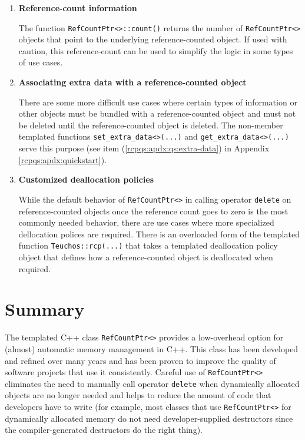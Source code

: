 \documentclass[pdf,ps2pdf,11pt]{SANDreport}
\begin{document}
\begin{enumerate}

\item \textbf{Reference-count information}

The function {}\texttt{Ref\-Count\-Ptr<>\-::count()} returns the
number of {}\texttt{Ref\-Count\-Ptr<>} objects that point to the
underlying reference-counted object.  If used with caution, this
reference-count can be used to simplify the logic in some types of use
cases.

\item \textbf{Associating extra data with a reference-counted object}

There are some more difficult use cases where certain types of
information or other objects must be bundled with a reference-counted
object and must not be deleted until the reference-counted object is
deleted.  The non-member templated functions
{}\texttt{set\-\_extra\-\_data<>(...)} and
{}\texttt{get\-\_extra\-\_data<>(...)} serve this purpose (see item
({}\ref{rcpqs:apdx:qs:extra-data}) in Appendix
{}\ref{rcpqs:apdx:quickstart}).

\item \textbf{Customized deallocation policies}

While the default behavior of {}\texttt{Ref\-Count\-Ptr<>} in calling
operator {}\texttt{delete} on reference-counted objects once the
reference count goes to zero is the most commonly needed behavior,
there are use cases where more specialized dellocation polices are
required.  There is an overloaded form of the templated function
{}\texttt{Teuchos\-::rcp(...)} that takes a templated deallocation
policy object that defines how a reference-counted object is
deallocated when required.

\end{enumerate}

%
\section{Summary}
%


The templated C++ class {}\texttt{Ref\-Count\-Ptr<>} provides a
low-overhead option for (almost) automatic memory management in C++.
This class has been developed and refined over many years and has been
proven to improve the quality of software projects that use it
consistently.  Careful use of {}\texttt{Ref\-Count\-Ptr<>} eliminates
the need to manually call operator {}\texttt{delete} when dynamically
allocated objects are no longer needed and helps to reduce the amount
of code that developers have to write (for example, most classes that
use {}\texttt{Ref\-Count\-Ptr<>} for dynamically allocated memory do
not need developer-supplied destructors since the compiler-generated
destructors do the right thing).
\end{document}
